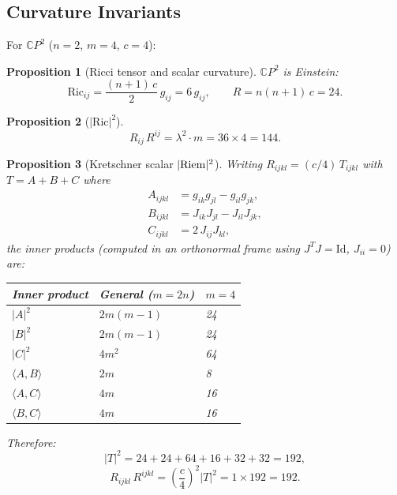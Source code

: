 \documentclass[11pt,a4paper]{article}
\newtheorem{proposition}{Proposition}
\begin{document}
\subsection{Curvature Invariants}

For $\mathbb{C}P^2$ ($n = 2$, $m = 4$, $c = 4$):

\begin{proposition}[Ricci tensor and scalar curvature]
$\mathbb{C}P^2$ is Einstein:
\begin{equation}
\mathrm{Ric}_{ij} = \frac{(n+1)\,c}{2}\,g_{ij} = 6\,g_{ij},
\qquad
R = n(n+1)\,c = 24.
\end{equation}
\end{proposition}

\begin{proposition}[$|\mathrm{Ric}|^2$]
\begin{equation}
R_{ij}\,R^{ij} = \lambda^2 \cdot m = 36 \times 4 = 144.
\end{equation}
\end{proposition}

\begin{proposition}[Kretschner scalar $|{\rm Riem}|^2$]\label{prop:Kretschner}
Writing $R_{ijkl} = (c/4)\,T_{ijkl}$ with $T = A + B + C$ where
\begin{align}
A_{ijkl} &= g_{ik}g_{jl} - g_{il}g_{jk}, \\
B_{ijkl} &= J_{ik}J_{jl} - J_{il}J_{jk}, \\
C_{ijkl} &= 2\,J_{ij}J_{kl},
\end{align}
the inner products (computed in an orthonormal frame using
$J^TJ = \mathrm{Id}$, $J_{ii} = 0$) are:
\begin{center}
\begin{tabular}{lll}
\toprule
Inner product & General ($m = 2n$) & $m = 4$ \\
\midrule
$|A|^2$ & $2m(m-1)$ & 24 \\
$|B|^2$ & $2m(m-1)$ & 24 \\
$|C|^2$ & $4m^2$ & 64 \\
$\langle A, B\rangle$ & $2m$ & 8 \\
$\langle A, C\rangle$ & $4m$ & 16 \\
$\langle B, C\rangle$ & $4m$ & 16 \\
\bottomrule
\end{tabular}
\end{center}
Therefore:
\begin{equation}
|T|^2 = 24 + 24 + 64 + 16 + 32 + 32 = 192,
\end{equation}
\begin{equation}
\boxed{R_{ijkl}\,R^{ijkl} = \left(\frac{c}{4}\right)^{\!2} |T|^2 = 1 \times 192 = 192.}
\end{equation}
\end{proposition}
\end{document}
